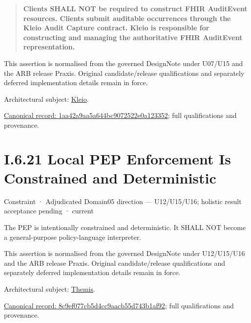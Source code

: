 \begin{quote}


\textbf{Clients SHALL NOT be required to construct FHIR AuditEvent resources. Clients submit auditable occurrences through the Kleio Audit Capture contract. Kleio is responsible for constructing and managing the authoritative FHIR AuditEvent representation.}



\end{quote}


This assertion is normalised from the governed DesignNote under U07/U15 and the ARB release Praxis. Original candidate/release qualifications and separately deferred implementation details remain in force.



Architectural subject: \hyperref[element:fefda110e2274884ad58906733606efd]{Kleio}.


{\footnotesize \href{../../../../../../../../continuum/motivation/constraint/1aa42a9aa5a644bc9072522e0a123352.md}{Canonical record: 1aa42a9aa5a644bc9072522e0a123352}; full qualifications and provenance.}\par
\section*{I.6.21 Local PEP Enforcement Is Constrained and Deterministic}
\label{navigation:I.6.21}

\label{element:8c9ef077cb5d4cc9aacb55d743b1af92}
{\small Constraint · Adjudicated Domain05 direction — U12/U15/U16; holistic result acceptance pending · current}\par

The PEP is intentionally constrained and deterministic. It SHALL NOT become a general-purpose policy-language interpreter.



This assertion is normalised from the governed DesignNote under U12/U15/U16 and the ARB release Praxis. Original candidate/release qualifications and separately deferred implementation details remain in force.



Architectural subject: \hyperref[element:899d34ec491948b68aad09e507dea6d1]{Themis}.


{\footnotesize \href{../../../../../../../../continuum/motivation/constraint/8c9ef077cb5d4cc9aacb55d743b1af92.md}{Canonical record: 8c9ef077cb5d4cc9aacb55d743b1af92}; full qualifications and provenance.}\par
